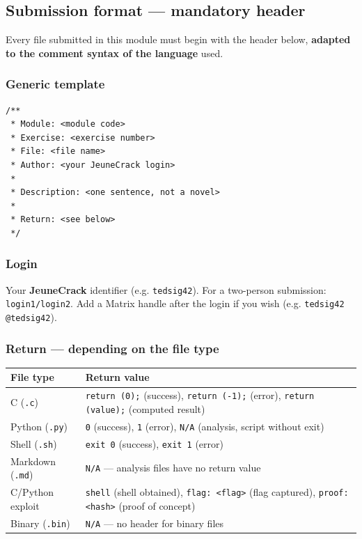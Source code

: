 \subsection*{Submission format --- mandatory header}

Every file submitted in this module must begin with the header below,
\textbf{adapted to the comment syntax of the language} used.

\subsubsection*{Generic template}

\begin{verbatim}
/**
 * Module: <module code>
 * Exercise: <exercise number>
 * File: <file name>
 * Author: <your JeuneCrack login>
 *
 * Description: <one sentence, not a novel>
 *
 * Return: <see below>
 */
\end{verbatim}

\subsubsection*{Login}

Your \textbf{JeuneCrack} identifier (e.g. \texttt{tedsig42}).
For a two-person submission: \texttt{login1/login2}.
Add a Matrix handle after the login if you wish
(e.g. \texttt{tedsig42 @tedsig42}).

\subsubsection*{Return --- depending on the file type}

\begin{tabularx}{\linewidth}{lX}
  \toprule
  \textbf{File type} & \textbf{Return value} \\
  \midrule
  C (\texttt{.c}) &
  \texttt{return (0);} (success),
  \texttt{return (-1);} (error),
  \texttt{return (value);} (computed result) \\

  Python (\texttt{.py}) &
  \texttt{0} (success),
  \texttt{1} (error),
  \texttt{N/A} (analysis, script without exit) \\

  Shell (\texttt{.sh}) &
  \texttt{exit 0} (success),
  \texttt{exit 1} (error) \\

  Markdown (\texttt{.md}) &
  \texttt{N/A} --- analysis files have no return value \\

  C/Python exploit &
  \texttt{shell} (shell obtained),
  \texttt{flag: <flag>} (flag captured),
  \texttt{proof: <hash>} (proof of concept) \\

  Binary (\texttt{.bin}) &
  \texttt{N/A} --- no header for binary files \\
  \bottomrule
\end{tabularx}

